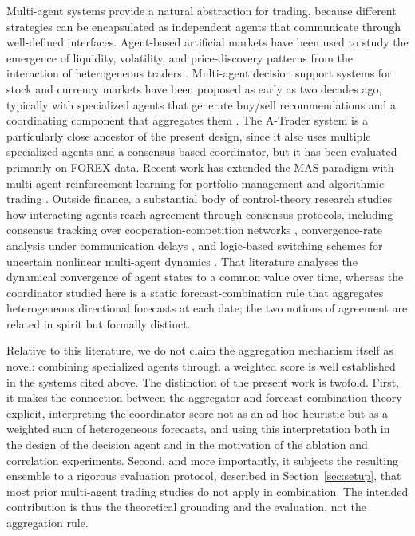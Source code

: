 \documentclass{ieeeaccess}
\begin{document}
Multi-agent systems provide a natural abstraction for trading, because different strategies can be encapsulated as independent agents that communicate through well-defined interfaces. Agent-based artificial markets have been used to study the emergence of liquidity, volatility, and price-discovery patterns from the interaction of heterogeneous traders \cite{lebaron2011,8675280}. Multi-agent decision support systems for stock and currency markets have been proposed as early as two decades ago, typically with specialized agents that generate buy/sell recommendations and a coordinating component that aggregates them \cite{luo2002,korczak2013,hernes2016,hernes2024}. The A-Trader system \cite{korczak2013,hernes2016} is a particularly close ancestor of the present design, since it also uses multiple specialized agents and a consensus-based coordinator, but it has been evaluated primarily on FOREX data. Recent work has extended the MAS paradigm with multi-agent reinforcement learning for portfolio management \cite{huang2022} and algorithmic trading \cite{shavandi2022}. Outside finance, a substantial body of control-theory research studies how interacting agents reach agreement through consensus protocols, including consensus tracking over cooperation-competition networks \cite{li2025consensus}, convergence-rate analysis under communication delays \cite{shi2025consensus}, and logic-based switching schemes for uncertain nonlinear multi-agent dynamics \cite{fan2025}. That literature analyses the dynamical convergence of agent states to a common value over time, whereas the coordinator studied here is a static forecast-combination rule that aggregates heterogeneous directional forecasts at each date; the two notions of agreement are related in spirit but formally distinct.

Relative to this literature, we do not claim the aggregation mechanism itself as novel: combining specialized agents through a weighted score is well established in the systems cited above. The distinction of the present work is twofold. First, it makes the connection between the aggregator and forecast-combination theory \cite{batesgranger1969,clemen1989,timmermann2006} explicit, interpreting the coordinator score not as an ad-hoc heuristic but as a weighted sum of heterogeneous forecasts, and using this interpretation both in the design of the decision agent and in the motivation of the ablation and correlation experiments. Second, and more importantly, it subjects the resulting ensemble to a rigorous evaluation protocol, described in Section~\ref{sec:setup}, that most prior multi-agent trading studies do not apply in combination. The intended contribution is thus the theoretical grounding and the evaluation, not the aggregation rule.
\end{document}

